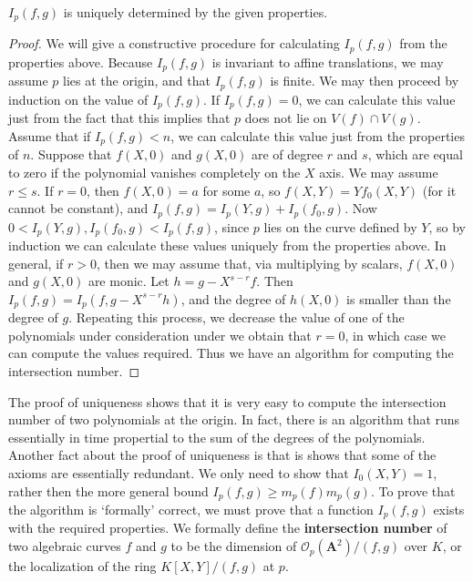 \begin{theorem}
    $I_p(f,g)$ is uniquely determined by the given properties.
\end{theorem}
\begin{proof}
    We will give a constructive procedure for calculating $I_p(f,g)$ from the properties above. Because $I_p(f,g)$ is invariant to affine translations, we may assume $p$ lies at the origin, and that $I_p(f,g)$ is finite. We may then proceed by induction on the value of $I_p(f,g)$. If $I_p(f,g) = 0$, we can calculate this value just from the fact that this implies that $p$ does not lie on $V(f) \cap V(g)$. Assume that if $I_p(f,g) < n$, we can calculate this value just from the properties of $n$. Suppose that $f(X,0)$ and $g(X,0)$ are of degree $r$ and $s$, which are equal to zero if the polynomial vanishes completely on the $X$ axis. We may assume $r \leq s$. If $r = 0$, then $f(X,0) = a$ for some $a$, so $f(X,Y) = Yf_0(X,Y)$ (for it cannot be constant), and $I_p(f,g) = I_p(Y,g) + I_p(f_0,g)$. Now $0 < I_p(Y,g), I_p(f_0,g) < I_p(f,g)$, since $p$ lies on the curve defined by $Y$, so by induction we can calculate these values uniquely from the properties above. In general, if $r > 0$, then we may assume that, via multiplying by scalars, $f(X,0)$ and $g(X,0)$ are monic. Let $h = g - X^{s-r}f$. Then $I_p(f,g) = I_p(f,g-X^{s-r}h)$, and the degree of $h(X,0)$ is smaller than the degree of $g$. Repeating this process, we decrease the value of one of the polynomials under consideration under we obtain that $r = 0$, in which case we can compute the values required. Thus we have an algorithm for computing the intersection number.
\end{proof}

The proof of uniqueness shows that it is very easy to compute the intersection number of two polynomials at the origin. In fact, there is an algorithm that runs essentially in time propertial to the sum of the degrees of the polynomials. Another fact about the proof of uniqueness is that is shows that some of the axioms are essentially redundant. We only need to show that $I_0(X,Y) = 1$, rather then the more general bound $I_p(f,g) \geq m_p(f) m_p(g)$. To prove that the algorithm is `formally' correct, we must prove that a function $I_p(f,g)$ exists with the required properties. We formally define the {\bf intersection number} of two algebraic curves $f$ and $g$ to be the dimension of $\mathcal{O}_p(\mathbf{A}^2)/(f,g)$ over $K$, or the localization of the ring $K[X,Y]/(f,g)$ at $p$.

